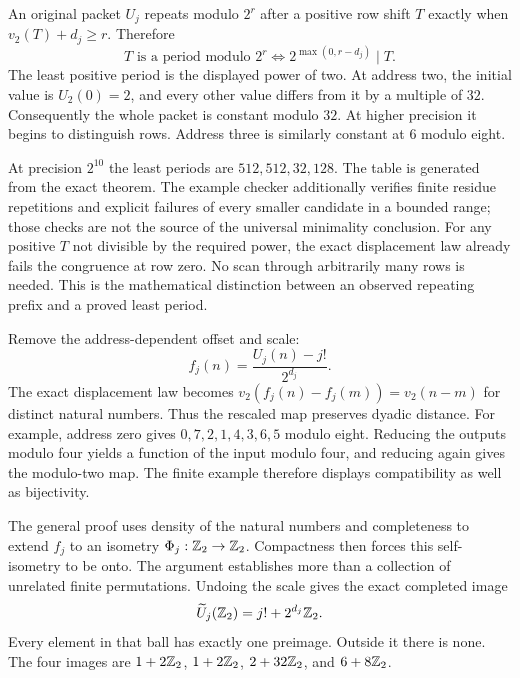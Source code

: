 An original packet $U_j$ repeats modulo $2^r$ after a positive row shift $T$ exactly when $v_2(T)+d_j\ge r$. Therefore
\[
 T\text{ is a period modulo }2^r
 \Longleftrightarrow 2^{\max(0,r-d_j)}\mid T.
\]
The least positive period is the displayed power of two.
At address two, the initial value is $U_2(0)=2$, and every other value differs from it by a multiple of $32$. Consequently the whole packet is constant modulo $32$. At higher precision it begins to distinguish rows. Address three is similarly constant at $6$ modulo eight.

At precision $2^{10}$ the least periods are $512,512,32,128$. The table is generated from the exact theorem. The example checker additionally verifies finite residue repetitions and explicit failures of every smaller candidate in a bounded range; those checks are not the source of the universal minimality conclusion.
For any positive $T$ not divisible by the required power, the exact displacement law already fails the congruence at row zero. No scan through arbitrarily many rows is needed. This is the mathematical distinction between an observed repeating prefix and a proved least period.

Remove the address-dependent offset and scale:
\[
 f_j(n)=\frac{U_j(n)-j!}{2^{d_j}}.
\]
The exact displacement law becomes $v_2(f_j(n)-f_j(m))=v_2(n-m)$ for distinct natural numbers. Thus the rescaled map preserves dyadic distance.
For example, address zero gives $0,7,2,1,4,3,6,5$ modulo eight. Reducing the outputs modulo four yields a function of the input modulo four, and reducing again gives the modulo-two map. The finite example therefore displays compatibility as well as bijectivity.

The general proof uses density of the natural numbers and completeness to extend $f_j$ to an isometry $\Phi_j:\mathbb Z_2\to\mathbb Z_2$. Compactness then forces this self-isometry to be onto. The argument establishes more than a collection of unrelated finite permutations.
Undoing the scale gives the exact completed image
\[
 \widetilde U_j(\mathbb Z_2)=j!+2^{d_j}\mathbb Z_2.
\]
Every element in that ball has exactly one preimage. Outside it there is none. The four images are $1+2\mathbb Z_2$, $1+2\mathbb Z_2$, $2+32\mathbb Z_2$, and $6+8\mathbb Z_2$.

